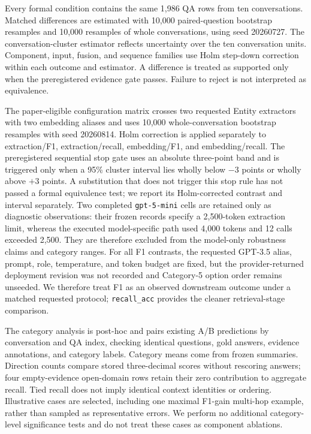 \documentclass[a4paper,twoside]{article}
\newcommand{\recallacc}{\texttt{recall\_acc}}
\begin{document}
Every formal condition contains the same 1,986 QA rows from ten conversations.
Matched differences are estimated with 10,000 paired-question bootstrap
resamples and 10,000 resamples of whole conversations, using seed 20260727.
The conversation-cluster estimator reflects uncertainty over the ten
conversation units. Component, input, fusion, and sequence families use Holm
step-down correction within each outcome and estimator. A difference is
treated as supported only when the preregistered evidence gate passes. Failure
to reject is not interpreted as equivalence.

The paper-eligible configuration matrix crosses two requested Entity
extractors with two embedding aliases and uses 10,000 whole-conversation
bootstrap resamples with seed 20260814. Holm correction is applied separately
to extraction/F1, extraction/recall, embedding/F1, and embedding/recall. The
preregistered sequential stop gate uses an absolute three-point band and is
triggered only when a 95\% cluster interval lies wholly below $-3$ points or
wholly above $+3$ points. A substitution that does not trigger
this stop rule has not passed a formal equivalence test; we report its
Holm-corrected contrast and interval separately. Two completed
\texttt{gpt-5-mini} cells are retained only as diagnostic observations: their
frozen records specify a 2,500-token extraction limit, whereas the executed
model-specific path used 4,000 tokens and 12 calls exceeded 2,500. They are
therefore excluded from the model-only robustness claims and category ranges.
For all F1 contrasts, the requested GPT-3.5 alias, prompt, role, temperature,
and token budget are fixed, but the provider-returned deployment revision was
not recorded and Category-5 option order remains unseeded. We therefore treat
F1 as an observed downstream outcome under a matched requested protocol;
\recallacc{} provides the cleaner retrieval-stage comparison.

The category analysis is post-hoc and pairs existing A/B predictions by
conversation and QA index, checking identical questions, gold answers,
evidence annotations, and category labels. Category means come from frozen
summaries. Direction counts compare stored three-decimal scores without
rescoring answers; four empty-evidence open-domain rows retain their zero
contribution to aggregate recall. Tied recall does not imply identical
context identities or ordering. Illustrative cases are selected, including
one maximal F1-gain multi-hop example, rather than sampled as representative
errors. We perform no additional category-level significance tests and do
not treat these cases as component ablations.
\end{document}

